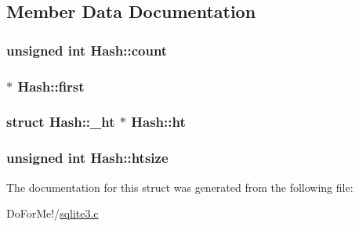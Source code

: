 \subsection{Member Data Documentation}
\hypertarget{struct_hash_a7ab16f173cdc347ffbe39eaa85ee6fda}{
\subsubsection[{count}]{\setlength{\rightskip}{0pt plus 5cm}unsigned int Hash\-::count}}\label{struct_hash_a7ab16f173cdc347ffbe39eaa85ee6fda}
\hypertarget{struct_hash_a2cfc9936ca2a624c6492ab6557f4705b}{
\subsubsection[{first}]{$\ast$ Hash\-::first}}\label{struct_hash_a2cfc9936ca2a624c6492ab6557f4705b}
\hypertarget{struct_hash_ac0f36e03746a3fe69643db08d93bc0c4}{
\subsubsection[{ht}]{\setlength{\rightskip}{0pt plus 5cm}struct {\bf Hash\-::\-\_\-ht} $\ast$ Hash\-::ht}}\label{struct_hash_ac0f36e03746a3fe69643db08d93bc0c4}
\hypertarget{struct_hash_a072258e24a38e09175f1308deb013bc8}{
\subsubsection[{htsize}]{\setlength{\rightskip}{0pt plus 5cm}unsigned int Hash\-::htsize}}\label{struct_hash_a072258e24a38e09175f1308deb013bc8}


The documentation for this struct was generated from the following file\-:\begin{DoxyCompactItemize}
\item 
Do\-For\-Me!/\hyperlink{sqlite3_8c}{sqlite3.\-c}\end{DoxyCompactItemize}
